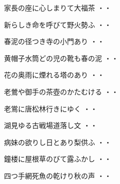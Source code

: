 \vspace{0.6cm}
\begin{shiika}家長の座に心しまりて大福茶
\hfill{・・}\end{shiika}
\vspace{0.6cm}
\begin{shiika}新らしき命を呼びて野火勢ふ
\hfill{・・}\end{shiika}
\vspace{0.6cm}
\begin{shiika}春泥の径つき寺の小門あり
\hfill{・・}\end{shiika}
\vspace{0.6cm}
\begin{shiika}黄帽子水筒どの児の靴も春の泥
\hfill{・・}\end{shiika}
\vspace{0.6cm}
\begin{shiika}花の奥雨に煙れる塔のあり
\hfill{・・}\end{shiika}
\vspace{0.6cm}
\begin{shiika}老鶯や御手の茶壺のかたむける
\hfill{・・}\end{shiika}
\vspace{0.6cm}
\begin{shiika}老鴬に唐松林行きにゆく
\hfill{・・}\end{shiika}
\vspace{0.6cm}
\begin{shiika}湖見ゆる古戦場道落し文
\hfill{・・}\end{shiika}
\vspace{0.6cm}
\begin{shiika}病妹の欲りし日とあり梨供ふ
\hfill{・・}\end{shiika}
\vspace{0.6cm}
\begin{shiika}鐘楼に屋根草のびて露ふかし
\hfill{・・}\end{shiika}
\vspace{0.6cm}
\begin{shiika}四つ手網死魚の乾けり秋の声
\hfill{・・}\end{shiika}

